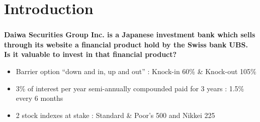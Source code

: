 \section{Introduction}

\begin{frame}
\frametitle{\insertsection}
\textbf{Daiwa Securities Group Inc. is a Japanese investment bank which sells through its website a financial product hold by the Swiss bank UBS.
\\Is it valuable to invest in that financial product?}
\begin{itemize}
	\item Barrier option “down and in, up and out” : Knock-in 60\% \& Knock-out 105\%
	\item 3\% of interest per year semi-annually compounded paid for 3 years : 1.5\% every 6 months
	\item 2 stock indexes at stake : Standard \& Poor's 500 and Nikkei 225
\end{itemize}
\end{frame}

